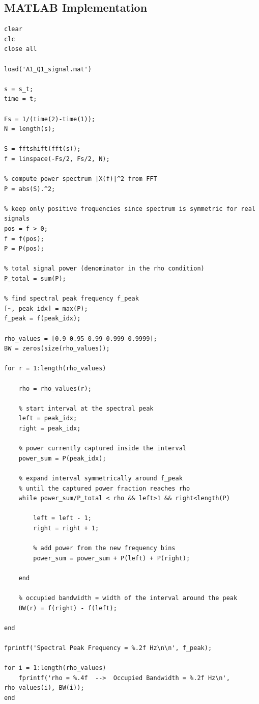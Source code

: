 \documentclass{article}
\begin{document}
\subsection*{MATLAB Implementation}

\begin{lstlisting}
clear
clc
close all

load('A1_Q1_signal.mat')

s = s_t;
time = t;

Fs = 1/(time(2)-time(1));
N = length(s);

S = fftshift(fft(s));
f = linspace(-Fs/2, Fs/2, N);

% compute power spectrum |X(f)|^2 from FFT
P = abs(S).^2;

% keep only positive frequencies since spectrum is symmetric for real signals
pos = f > 0;
f = f(pos);
P = P(pos);

% total signal power (denominator in the rho condition)
P_total = sum(P);

% find spectral peak frequency f_peak
[~, peak_idx] = max(P);
f_peak = f(peak_idx);

rho_values = [0.9 0.95 0.99 0.999 0.9999];
BW = zeros(size(rho_values));

for r = 1:length(rho_values)

    rho = rho_values(r);

    % start interval at the spectral peak
    left = peak_idx;
    right = peak_idx;

    % power currently captured inside the interval
    power_sum = P(peak_idx);

    % expand interval symmetrically around f_peak
    % until the captured power fraction reaches rho
    while power_sum/P_total < rho && left>1 && right<length(P)

        left = left - 1;
        right = right + 1;

        % add power from the new frequency bins
        power_sum = power_sum + P(left) + P(right);

    end

    % occupied bandwidth = width of the interval around the peak
    BW(r) = f(right) - f(left);

end

fprintf('Spectral Peak Frequency = %.2f Hz\n\n', f_peak);

for i = 1:length(rho_values)
    fprintf('rho = %.4f  -->  Occupied Bandwidth = %.2f Hz\n', rho_values(i), BW(i));
end
\end{lstlisting}
\end{document}
